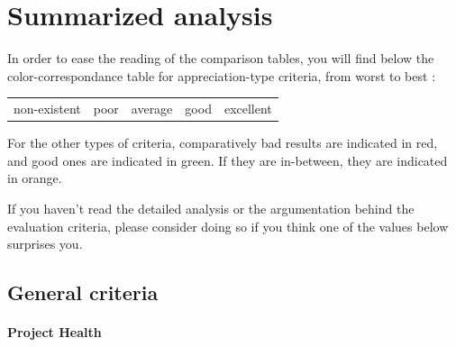 \documentclass{article}
\begin{document}
\newpage

\section{Summarized analysis}

In order to ease the reading of the comparison tables, you will find below the color-correspondance table for appreciation-type criteria, from worst to best :

\begin{center}
\begin{tabular}{r|r|r|r|r}
\cellcolor{red!25}non-existent & \cellcolor{orange!25}poor & \cellcolor{yellow!25}average & \cellcolor{blue!10}good & \cellcolor{green!25}excellent \\
\end{tabular}
\end{center}

For the other types of criteria, comparatively bad results are indicated in red, and good ones are indicated in green. If they are in-between, they are indicated in orange.

If you haven't read the detailed analysis or the argumentation behind the evaluation criteria, please consider doing so if you think one of the values below surprises you.

\subsection{General criteria}

\paragraph{Project Health}
\end{document}
